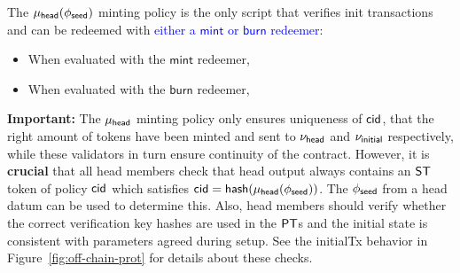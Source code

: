 \noindent The $\mu_\mathsf{head}(\phi_{\mathsf{seed}})$ minting policy is the only script that verifies
init transactions and can be redeemed with \textcolor{blue}{either a $\mathsf{mint}$ or
	$\mathsf{burn}$ redeemer}:
\begin{itemize}
	\item When evaluated with the $\mathsf{mint}$ redeemer,
	\item When evaluated with the $\mathsf{burn}$ redeemer,
\end{itemize}

\noindent \textbf{Important:} The $\mu_\mathsf{head}$ minting policy only ensures
uniqueness of $\mathsf{cid}$, that the right amount of tokens have been minted and sent
to $\nu_\mathsf{head}$ and $\nu_{\mathsf{initial}}$ respectively, while these validators in turn
ensure continuity of the contract. However, it is \textbf{crucial} that all head
members check that head output always contains an $\mathsf{ST}$ token of policy $\mathsf{cid}$
which satisfies $\mathsf{cid} = \mathsf{hash}(\mu_\mathsf{head}(\phi_{\mathsf{seed}}))$. The $\phi_{\mathsf{seed}}$ from a head datum
can be used to determine this. Also, head members should verify whether the
correct verification key hashes are used in the $\mathsf{PT}$s and the initial state is
consistent with parameters agreed during setup. See the initialTx behavior in
Figure~\ref{fig:off-chain-prot} for details about these checks.\\

